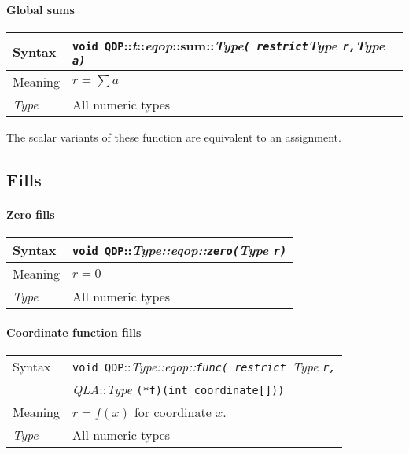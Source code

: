 \documentclass[12pt,letterpaper]{article}
\newcommand{\namespace}{QDP}
\newcommand{\allNumericTypes}{All numeric types}
\newcommand{\ttdash}{{::}}
\newcommand{\itt}{\it Type}
\newcommand{\extraarg}{}
\newcommand{\protoUnarySum}{{\tt void \namespace}\ttdash{\it t}\ttdash{\it eqop}\ttdash sum\ttdash\itt{\tt ( restrict}{\it Type }{\tt *r,}{\it Type }{\tt *a\extraarg)}}
\begin{document}
\paragraph{Global sums}

\begin{flushleft}
  \begin{tabular}{|l|l|}
  \hline
  Syntax      & \protoUnarySum \\
  \hline
  Meaning     & $r = \sum a$ \\
  \hline
  \itt     & \allNumericTypes \\
  \hline
  \end{tabular}
\end{flushleft}

The scalar variants of these function are equivalent to an assignment.

\subsection{Fills}

\paragraph{Zero fills}

\begin{flushleft}
  \begin{tabular}{|l|l|}
  \hline
  Syntax      & {\tt void \namespace}\ttdash\itt\ttdash{\it eqop}\ttdash{\tt zero}{\tt (}{\it Type }{\tt *r\extraarg)} \\
  \hline
  Meaning     & $r = 0$ \\
  \hline
  \itt        & \allNumericTypes \\
  \hline
  \end{tabular}
\end{flushleft}

\paragraph{Coordinate function fills}

\begin{flushleft}
  \begin{tabular}{|l|l|}
  \hline
  Syntax      & {\tt void \namespace}\ttdash\itt\ttdash{\it eqop}\ttdash{\tt func( restrict }{\it Type }{\tt *r,}\\
              & {\it QLA}\ttdash{\it Type }{\tt *(*f)(int coordinate[])\extraarg)} \\
  \hline
  Meaning     & $r = f(x)$ for coordinate $x$.\\
  \hline
  \itt        & \allNumericTypes \\
  \hline
  \end{tabular}
\end{flushleft}
\end{document}
